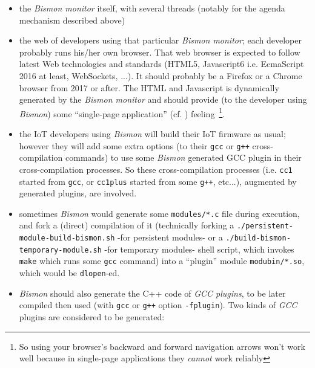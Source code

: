\begin{itemize}
\item the \emph{Bismon monitor} itself, with several threads (notably for the agenda mechanism described above)
  
  \item the web  of developers using that
    particular \emph{Bismon monitor}; each developer probably runs
    his/her own browser. That web browser is expected to follow latest
    Web technologies and standards (HTML5, Javascript6 i.e. EcmaScript
    2016 at least, WebSockets, ...). It should probably be a Firefox
    or a Chrome browser from 2017 or after. The HTML and Javascript is
    dynamically generated by the \emph{Bismon monitor} and should
    provide (to the developer using \emph{Bismon}) some ``single-page
    application'' (cf. \cite{Atkinson:2018:webtabs,
      Queinnec:2004:ContinWeb, Graunke:2003:ModelingWeb})
    feeling~\footnote{So using your browser's backward and forward
      navigation arrows won't work well because in single-page
      applications they \emph{cannot} work reliably}.

    \item the IoT developers using \emph{Bismon} will build their IoT
      firmware as usual; however they will add some extra options (to
      their \texttt{gcc} or \texttt{g++} cross-compilation commands)
      to use some \emph{Bismon} generated GCC plugin in their
      cross-compilation processes. So these cross-compilation
      processes (i.e. \texttt{cc1} started from \texttt{gcc}, or
      \texttt{cc1plus} started from some \texttt{g++}, etc...),
      augmented by generated plugins, are involved.

  \item sometimes \emph{Bismon} would generate some
    \texttt{modules/*.c} file during execution, and fork a (direct)
    compilation of it (technically forking a
    \texttt{./persistent-module-build-bismon.sh} -for persistent
    modules- or a \texttt{./build-bismon-temporary-module.sh} -for
    temporary modules- shell script, which invokes \texttt{make} which
    runs some \texttt{gcc} command) into a ``plugin'' module
    \texttt{modubin/*.so}, which would be \texttt{dlopen}-ed.

  \item \emph{Bismon} should also generate the C++ code of \emph{GCC
    plugins}, to be later compiled then used (with \texttt{gcc} or
    \texttt{g++} option \texttt{-fplugin}). Two kinds of \emph{GCC}
    plugins are considered to be generated:


\end{itemize}
